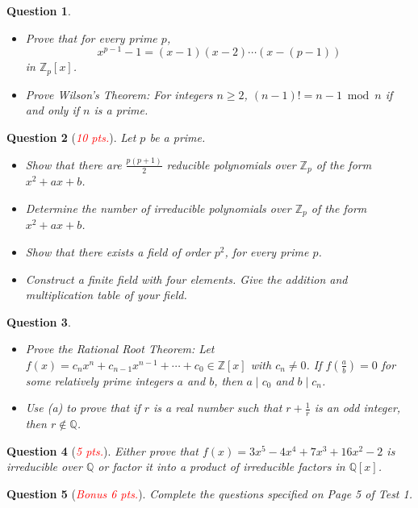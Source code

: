 \documentclass[11pt]{amsart}
\newtheorem{question}{Question}
\theoremstyle{definition}\newtheorem{solution}{Solution}
\theoremstyle{definition}\newtheorem{definition}{Definition}
\newcommand{\Q}{\mathbb{Q}}
\newcommand{\Z}{\mathbb{Z}}
\begin{document}
\begin{question}
    \begin{itemize}
        \item[(a)] Prove that for every prime $p$,
        \begin{equation*}
            x^{p - 1} - 1 = (x - 1)(x - 2)\cdots(x - (p - 1))
        \end{equation*}
        in $\Z_p[x]$.
        \item[(b)] Prove Wilson's Theorem: For integers $n \geq 2$, $(n - 1)! = n - 1 \bmod n$ if and only if $n$ is a prime.
    \end{itemize}
\end{question}

\begin{question}[\textcolor{red}{\emph{10 pts.}}]
    Let $p$ be a prime.
    \begin{itemize}
        \item[(a)] Show that there are $\frac{p(p + 1)}{2}$ reducible polynomials over $\Z_p$ of the form $x^2 + ax + b$.
        \item[(b)] Determine the number of irreducible polynomials over $\Z_p$ of the form $x^2 + ax + b$.
        \item[(c)] Show that there exists a field of order $p^2$, for every prime $p$.
        \item[(d)] Construct a finite field with four elements. Give the addition and multiplication table of your field.
    \end{itemize}
\end{question}

\begin{question}
    \begin{itemize}
        \item[(a)] Prove the Rational Root Theorem: Let $f(x) = c_nx^n + c_{n - 1}x^{n - 1} + \cdots + c_0 \in \Z[x]$ with $c_n \neq 0$. If $f\left(\frac{a}{b}\right) = 0$ for some relatively prime integers $a$ and $b$, then $a \mid c_0$ and $b \mid c_n$.
        \item[(b)] Use (a) to prove that if $r$ is a real number such that $r + \frac{1}{r}$ is an odd integer, then $r \notin \Q$.
    \end{itemize}
\end{question}

\begin{question}[\textcolor{red}{\emph{5 pts.}}]
    Either prove that $f(x) = 3x^5 - 4x^4 + 7x^3 + 16x^2 - 2$ is irreducible over $\Q$ or factor it into a product of irreducible factors in $\Q[x]$.
\end{question}

\begin{question}[\textcolor{red}{\emph{Bonus 6 pts.}}]
    Complete the questions specified on Page 5 of Test 1.
\end{question}
\end{document}
